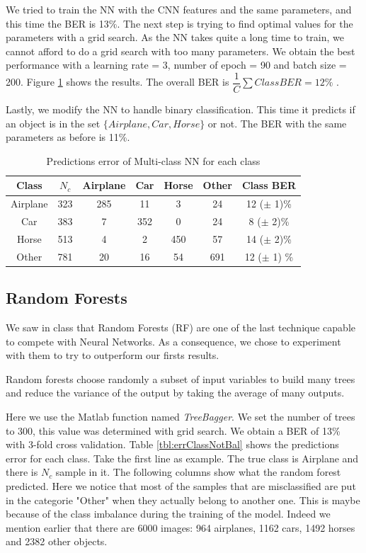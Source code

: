 \documentclass{article} %
\begin{document}
We tried to train the NN with the CNN features and the same parameters, and this time the BER is 13\%.
The next step is trying to find optimal values for the parameters with a grid search. As the NN takes quite a long time to train, we cannot afford to do a grid search with too many parameters.
We obtain the best performance with a learning rate = 3, number of epoch = 90 and batch size = 200. 
Figure \ref{tbl:errClassNN} shows the results. The overall BER is $\dfrac{1}{C}\sum Class BER= 12\%$ . 

Lastly, we modify the NN to handle binary classification. This time it predicts if an object is in the set $\{Airplane, Car, Horse\}$ or not. The BER with the same parameters as before is 11\%.

\begin{table}
	\centering
	\begin{tabular}{|c|c|c|c|c|c|c|}
		\hline Class & $N_{c}$ & Airplane & Car & Horse & Other & Class BER \\ 
		\hline Airplane	  & 323 & 285 & 11 & 3 & 24 & 12 ($\pm$ 1)\% \\ 
		\hline Car        & 383 & 7 & 352 & 0 & 24 &  8 ($\pm$ 2)\% \\ 
		\hline Horse      & 513 & 4 & 2 & 450 & 57 &  14 ($\pm$ 2)\% \\ 
		\hline Other      & 781 & 20 & 16 & 54 & 691 & 12 ($\pm$ 1) \% \\ 
		\hline 
	\end{tabular} 
	\caption{Predictions error of Multi-class NN for each class}
	\label{tbl:errClassNN}
\end{table}

\subsection{Random Forests}
We saw in class that Random Forests (RF) are one of the last technique capable to compete with Neural Networks.
As a consequence, we chose to experiment with them to try to outperform our firsts results.

Random forests choose randomly a subset of input variables to build many trees and reduce the variance of the output by taking the average of many outputs.

Here we use the Matlab function named \emph{TreeBagger}. We set the number of trees to 300, this value was determined with grid search.
We obtain a BER of 13\% with 3-fold cross validation. Table \ref{tbl:errClassNotBal} shows the predictions error for each class. Take the first line as example. The true class is Airplane and there is $N_c$ sample in it. The following columns show what the random forest predicted.
Here we notice that most of the samples that are misclassified are put in the categorie "Other" when they actually belong to another one.
This is maybe because of the class imbalance during the training of the model. Indeed we mention earlier that there are 6000 images: 964 airplanes, 1162 cars, 1492 horses and 2382 other objects.
\end{document}
